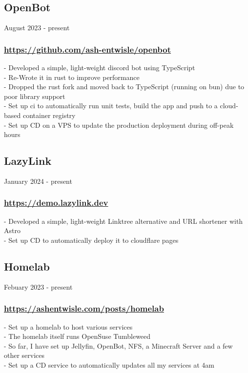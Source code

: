 \subsection{OpenBot} August 2023 - present \\
\subsubsection{\href{https://github.com/ash-entwisle/openbot}{https://github.com/ash-entwisle/openbot}}
-\:  Developed a simple, light-weight discord bot using TypeScript \\
-\:  Re-Wrote it in rust to improve performance \\
-\:  Dropped the rust fork and moved back    to TypeScript (running on bun) due to poor library support \\
-\:  Set up ci to automatically run unit tests, build the app and push to a cloud-based container registry \\
-\:  Set up CD on a VPS to update the production deployment during off-peak hours \\

\subsection{LazyLink} January 2024 - present \\
\subsubsection{\href{https://demo.lazylink.dev}{https://demo.lazylink.dev}}
-\: Developed a simple, light-weight Linktree alternative and URL shortener with Astro \\
-\: Set up CD to automatically deploy it to cloudflare pages \\

\subsection{Homelab} Febuary 2023 - present \\
\subsubsection{\href{https://ashentwisle.com/posts/homelab-go-brrr}{https://ashentwisle.com/posts/homelab}}
-\:  Set up a homelab to host various services \\
-\:  The homelab itself runs OpenSuse Tumbleweed \\
-\:  So far, I have set up Jellyfin, OpenBot, NFS, a Minecraft Server and a few other services \\
-\:  Set up a CD service to automatically updates all my services at 4am \\



